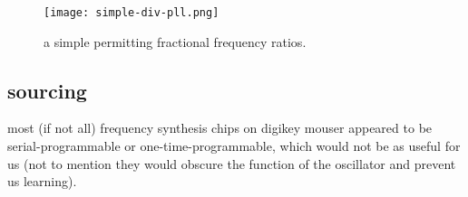 \begin{figure}[H]
	\centering
	\texttt{[image: simple-div-pll.png]}
	\caption{a simple \pll permitting fractional frequency ratios.}
	\label{fig:simple-div-pll}
\end{figure}

\subsection*{sourcing}
most (if not all) frequency synthesis chips on digikey \amp mouser appeared to
be serial-programmable or one-time-programmable, which would not be as useful
for us (not to mention they would obscure the function of the oscillator and
prevent us learning).

